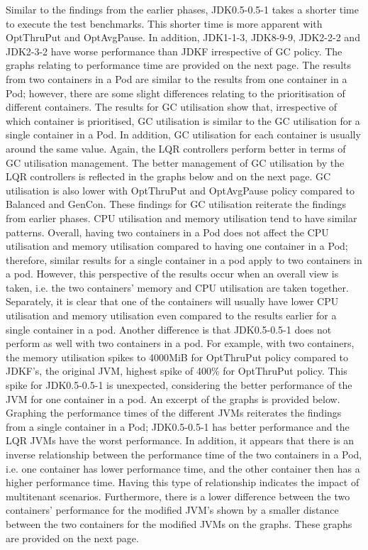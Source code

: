 Similar to the findings from the earlier phases, JDK0.5-0.5-1 takes
a shorter time to execute the test benchmarks. This shorter time is more
apparent with OptThruPut and OptAvgPause. In addition, JDK1-1-3,
JDK8-9-9, JDK2-2-2 and JDK2-3-2 have worse performance than JDKF
irrespective of GC policy. The graphs relating to performance time are
provided on the next page.
The results from two containers in a Pod are similar to the results
from one container in a Pod; however, there are some slight differences
relating to the prioritisation of different containers.
\newline\newline 
The results for GC utilisation show that, irrespective of which
container is prioritised, GC utilisation is similar to the GC
utilisation for a single container in a Pod. In addition, GC utilisation
for each container is usually around the same value. Again, the LQR
controllers perform better in terms of GC utilisation management. The better management of GC utilisation by the LQR controllers
is reflected in the graphs below and on the next page. GC utilisation is also
lower with OptThruPut and OptAvgPause policy compared to Balanced and
GenCon. These findings for GC utilisation reiterate the findings from
earlier phases.
CPU utilisation and memory utilisation tend to have similar
patterns. Overall, having two containers in a Pod does not affect the
CPU utilisation and memory utilisation compared to having one container
in a Pod; therefore, similar results for a single container in a pod
apply to two containers in a pod. However, this perspective of the
results occur when an overall view is taken, i.e. the two containers'
memory and CPU utilisation are taken together. Separately, it is clear
that one of the containers will usually have lower CPU utilisation and
memory utilisation even compared to the results earlier for a single
container in a pod. Another difference is that JDK0.5-0.5-1 does not
perform as well with two containers in a pod. For example, with two
containers, the memory utilisation spikes to 4000MiB for OptThruPut
policy compared to JDKF's, the original JVM, highest spike of
400\% for OptThruPut policy. This spike for JDK0.5-0.5-1 is unexpected,
considering the better performance of the JVM for one container in a
pod. An excerpt of the graphs is provided below.
Graphing the performance times of the different JVMs reiterates the
findings from a single container in a Pod; JDK0.5-0.5-1 has better
performance and the LQR JVMs have the worst performance. In addition, it
appears that there is an inverse relationship between the performance
time of the two containers in a Pod, i.e. one container has lower
performance time, and the other container then has a higher performance
time. Having this type of relationship indicates the impact of
multitenant scenarios. Furthermore, there is a lower difference between
the two containers' performance for the modified JVM's shown by a
smaller distance between the two containers for the modified JVMs on the
graphs. These graphs are provided on the next page.
